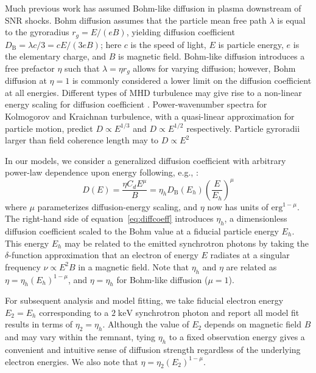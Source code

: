 \documentclass[iop, apj, numberedappendix]{emulateapj}
\newcommand*{\mt}{\mathrm}
\newcommand*{\unit}[1]{\;\mt{#1}}  %
\begin{document}
Much previous work has assumed Bohm-like diffusion in plasma downstream of SNR
shocks.  Bohm diffusion assumes that the particle mean free path $\lambda$ is
equal to the gyroradius $r_g = E/(eB)$, yielding diffusion coefficient
$D_{\mt{B}} = \lambda c / 3 = c E / (3 e B)$; here $c$ is the speed of light,
$E$ is particle energy, $e$ is the elementary charge, and $B$ is magnetic
field.  Bohm-like diffusion introduces a free prefactor $\eta$ such that
$\lambda = \eta r_g$ allows for varying diffusion; however, Bohm diffusion at
$\eta = 1$ is commonly considered a lower limit on the diffusion coefficient at
all energies.
Different types of MHD turbulence may give rise to a non-linear energy
scaling for diffusion coefficient \citep{giacalone1999, reynolds2004}.
Power-wavenumber spectra for Kolmogorov and Kraichnan turbulence, with a
quasi-linear approximation for particle motion,
predict $D \propto E^{1/3}$ and $D \propto E^{1/2}$ respectively.
Particle gyroradii larger than field coherence length may to $D \propto E^{2}$

In our models, we consider a generalized diffusion coefficient with arbitrary
power-law dependence upon energy following, e.g., \citet{parizot2006}:
\begin{equation} \label{eq:diffcoeff}
    D(E) = \frac{\eta C_d E^\mu}{B}
         = \eta_h D_{\mt{B}}\left(E_h\right) \left(\frac{E}{E_h}\right)^\mu
\end{equation}
where $\mu$ parameterizes diffusion-energy scaling, and $\eta$ now has units
of $\mathrm{erg}^{1-\mu}$.
The right-hand side of equation~\eqref{eq:diffcoeff} introduces $\eta_h$, a
dimensionless diffusion coefficient scaled to the Bohm value at a fiducial
particle energy $E_h$.  This energy $E_h$ may be related to the emitted
synchrotron photons by taking the $\delta$-function approximation that an
electron of energy $E$ radiates at a singular frequency $\nu \propto E^2 B$ in
a magnetic field.  Note that $\eta_h$ and $\eta$ are related as
$\eta = \eta_h (E_h)^{1-\mu}$, and $\eta = \eta_h$ for Bohm-like diffusion
($\mu = 1$).

For subsequent analysis and model fitting, we take fiducial electron energy
$E_2 = E_h$ corresponding to a $2 \unit{keV}$ synchrotron photon and report all
model fit results in terms of $\eta_2 = \eta_h$.  Although the value of $E_2$
depends on magnetic field $B$ and may vary within the remnant, tying $\eta_h$
to a fixed observation energy gives a convenient and intuitive sense of
diffusion strength regardless of the underlying electron energies.
We also note that $\eta = \eta_2 (E_2)^{1-\mu}$.
\end{document}
